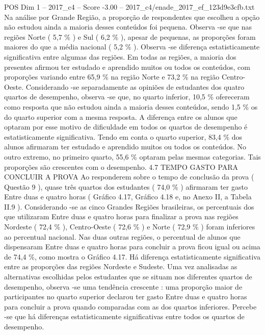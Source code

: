\begin{textsample}{POS Dim 1 – 2017\_c4 – Score -3.00 – 2017\_c4/enade\_2017\_ef\_123d9e3cfb.txt}
Na análise por Grande Região, a proporção de respondentes que escolheu a opção não estudou ainda a maioria desses conteúdos foi pequena.
Observa -se que nas regiões Norte ( 5,7 \% ) e Sul ( 6,2 \% ), apesar de pequenas, as proporções foram maiores do que a média nacional ( 5,2 \% ).
Observa -se diferença estatisticamente significativa entre algumas das regiões.
Em todas as regiões, a maioria dos presentes afirmou ter estudado e aprendido muitos ou todos os conteúdos, com proporções variando entre 65,9 \% na região Norte e 73,2 \% na região Centro-Oeste.
Considerando -se separadamente as opiniões de estudantes dos quatro quartos de desempenho, observa -se que, no quarto inferior, 10,5 \% ofereceram como resposta que não estudou ainda a maioria desses conteúdos, sendo 1,5 \% os do quarto superior com a mesma resposta.
A diferença entre os alunos que optaram por esse motivo de dificuldade em todos os quartos de desempenho é estatisticamente significativa.
Tendo em conta o quarto superior, 83,4 \% dos alunos afirmaram ter estudado e aprendido muitos ou todos os conteúdos.
No outro extremo, no primeiro quarto, 55,6 \% optaram pelas mesmas categorias.
Tais proporções são crescentes com o desempenho. 4.7 TEMPO GASTO PARA CONCLUIR A PROVA Ao responderem sobre o tempo de conclusão da prova ( Questão 9 ), quase três quartos dos estudantes ( 74,0 \% ) afirmaram ter gasto Entre duas e quatro horas ( Gráfico 4.17, Gráfico 4.18 e, no Anexo II, a Tabela II.9 ).
Considerando -se as cinco Grandes Regiões brasileiras, os percentuais dos que utilizaram Entre duas e quatro horas para finalizar a prova nas regiões Nordeste ( 72,4 \% ), Centro-Oeste ( 72,6 \% ) e Norte ( 72,9 \% ) foram inferiores ao percentual nacional.
Nas duas outras regiões, o percentual de alunos que dispensaram Entre duas e quatro horas para concluir a prova ficou igual ou acima de 74,4 \%, como mostra o Gráfico 4.17.
Há diferença estatisticamente significativa entre as proporções das regiões Nordeste e Sudeste.
Uma vez analisadas as alternativas escolhidas pelos estudantes que se situam nos diferentes quartos de desempenho, observa -se uma tendência crescente : uma proporção maior de participantes no quarto superior declarou ter gasto Entre duas e quatro horas para concluir a prova quando comparadas com as dos quartos inferiores.
Percebe -se que há diferenças estatisticamente significativas entre todos os quartos de desempenho.

\end{textsample}

